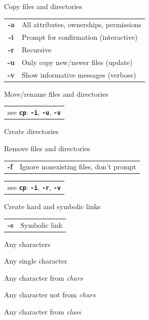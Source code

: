 \documentclass[12pt, a4paper]
{article}
\begin{document}
\begin{multicols}{3}

\begin{description}[nolistsep]
	\item[cp] Copy files and directories
	\item
	\begin{tabular}{cl}
		{\large \ttfamily \textbf{-a}} & All attributes, ownerships, permissions \\
		{\large \ttfamily \textbf{-i}} & Prompt for confirmation (interactive)\\
		{\large \ttfamily \textbf{-r}} & Recursive \\
		{\large \ttfamily \textbf{-u}} & Only copy new/newer files (update) \\
		{\large \ttfamily \textbf{-v}} & Show informative messages (verbose)\\
	\end{tabular}
	\item[mv] Move/rename files and directories
	\item
	\begin{tabular}{l}
		see \texttt{\textbf{cp}}: \texttt{\textbf{-i}}, \texttt{\textbf{-u}}, \texttt{\textbf{-v}}
	\end{tabular}
	\item[mkdir] Create directories
	\item[rm] Remove files and directories
	\item
	\begin{tabular}{cl}
		{\large \ttfamily \textbf{-f}} & Ignore nonexisting files, don't prompt
	\end{tabular}
	\item
	\begin{tabular}{l}
		see \texttt{\textbf{cp}}: \texttt{\textbf{-i}}, \texttt{\textbf{-r}}, \texttt{\textbf{-v}}
	\end{tabular}
	\item[ln] Create hard and symbolic links
	\item
	\begin{tabular}{cl}
		{\large \ttfamily \textbf{-s}} & Symbolic link
	\end{tabular}
\end{description}


\begin{description}[nolistsep]
	\item[*] Any characters
	\item[?] Any single character
	\item[{[\large \textit{chars}}{\Large]}] Any character from \textit{chars}
	\item[{[\large!\textit{chars}}{\Large]}] Any character not from \textit{chars}
	\item[{[\large:\textit{class}:}{\Large]}] Any character from \textit{class}
\end{description}


\end{multicols}
\end{document}
